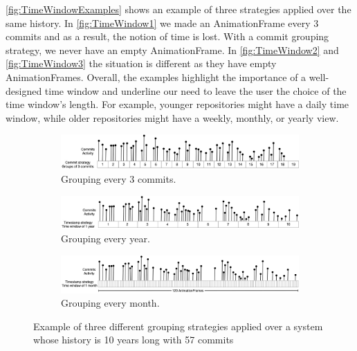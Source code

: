 \autoref{fig:TimeWindowExamples} shows an example of three strategies applied over the same history. In \autoref{fig:TimeWindow1} we made an AnimationFrame every 3 commits and as a result, the notion of time is lost. With a commit grouping strategy, we never have an empty AnimationFrame. In \autoref{fig:TimeWindow2} and \autoref{fig:TimeWindow3} the situation is different as they have empty AnimationFrames.
Overall, the examples highlight the importance of a well-designed time window and underline our need to leave the user the choice of the time window's length. For example, younger repositories might have a daily time window, while older repositories might have a weekly, monthly, or yearly view. 

\begin{figure}
    \begin{center}
        \begin{subfigure}{1\textwidth}
            \includegraphics[width=\linewidth]{TimeWindow1.jpg}
            \caption{Grouping every 3 commits.} 
            \label{fig:TimeWindow1}
        \end{subfigure}
        \begin{subfigure}{1\textwidth}
            \includegraphics[width=\linewidth]{TimeWindow2.jpg}
            \caption{Grouping every year.} 
            \label{fig:TimeWindow2}
        \end{subfigure}
        \begin{subfigure}{1\textwidth}
            \includegraphics[width=\linewidth]{TimeWindow3.jpg}
            \caption{Grouping every month.}
            \label{fig:TimeWindow3}
        \end{subfigure}
        \caption[Example of three different grouping strategies]{Example of three different grouping strategies applied over a system whose history is 10 years long with 57 commits}
        \label{fig:TimeWindowExamples}
    \end{center}
\end{figure}



